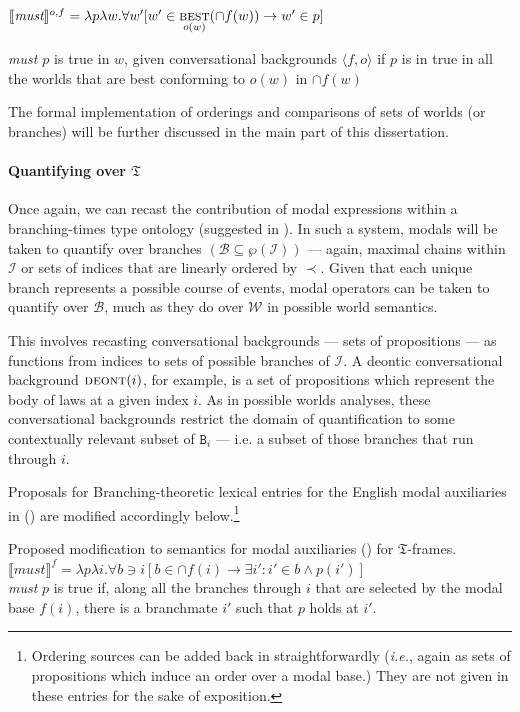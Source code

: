 \documentclass[12pt,dvipsnames]{report}
\providecommand{\denote}[2][]{\ensuremath{\llbracket{#2}\rrbracket^{#1}}}
\begin{document}
$\denote[o,f]{\textit{must}}=\lambda p\lambda w.\forall w'[w'\in\underset{o(w)}{\textsc{best}}(\cap f(w))\to w'\in p] $

\textit{must $ p $} is true in $ w $, given conversational backgrounds $ \langle{f,o}\rangle $ if $ p $ is in true in all the worlds that are best conforming to $ o(w) $ in $ \cap f(w) $
\xe





The formal implementation of orderings and comparisons of sets of worlds (or branches) will be further discussed in the main part of this dissertation.

\paragraph{Quantifying over $ \mathfrak{T} $}

Once again, we can recast the contribution of modal expressions within a branching-times type ontology (suggested in \citealp[594, note 9]{VonPrince2019}). In such a system, modals will be taken to quantify over branches $ (\mathcal{B\subseteq\wp(I)})$ --- again, maximal chains within $ \mathcal I $ or sets of indices that are linearly ordered by $ \prec $. Given that each unique branch represents a possible course of events, modal operators can be taken to quantify over $ \mathcal B $, much as they do over $ \mathcal W $ in possible world semantics.

This involves recasting conversational backgrounds --- sets of propositions --- as functions from indices to sets of possible branches of $ \mathcal I $. A deontic conversational background $ \textsc{deont}(i) $, for example, is a set of propositions which represent the body of laws at a given index $ i $. As in possible worlds analyses, these conversational backgrounds restrict the domain of quantification to some contextually relevant subset of  $ \texttt{B}_i $ --- i.e. a subset of those branches that run through $ i $.

Proposals for Branching-theoretic lexical entries for the English modal auxiliaries in () are modified accordingly below.\footnote{Ordering sources can be added back in straightforwardly (\textit{i.e.}, again as sets of propositions which induce an order over a modal base.) They are not given in these entries for the sake of exposition.}

\pex[exno=\getref{K-modals}′⁣] Proposed modification to semantics for modal auxiliaries () for $ \mathfrak T $-frames.
\a$ \denote[f]{\textit{must}}=\lambda p\lambda i.\forall b\ni i[b\in\cap f(i)\to \exists i':i'\in b\wedge p(i')] $\\
\textit{must} $ p $ is true if, along all the branches through $ i $ that are selected by the modal base $ f(i) $, there is a branchmate $ i' $ such that $ p $ holds at $ i' $.
\end{document}
